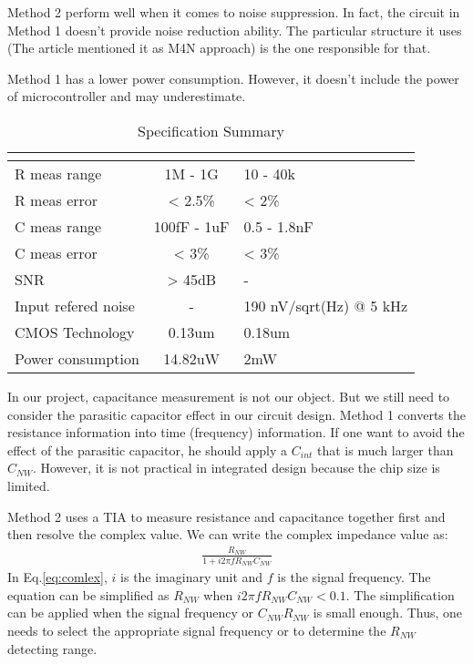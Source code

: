 Method 2 perform well when it comes to noise suppression.
In fact, the circuit in Method 1 doesn't provide noise reduction ability.
The particular structure it uses (The article \cite{Juv1} mentioned it as M4N approach) is the one responsible for that.

Method 1 has a lower power consumption. However, it doesn't include the power of microcontroller and may underestimate.

\begin{table}[!htb]
    {\fontfamily{}\fontsize{10}{14}\selectfont
    \centering
    \begin{tabular}{l|cp{4cm}}
        & \cite{Juv2} & \cite{Jlockin}\\
        \hline
        R meas range & 1M - 1G & 10 - 40k\\
        \hline
        R meas error & < 2.5\% & < 2\%\\
        \hline
        C meas range & 100fF - 1uF & 0.5 - 1.8nF\\
        \hline
        C meas error & < 3\% & < 3\%\\
        \hline
        SNR & > 45dB & - \\
        \hline
        Input refered noise & - & 190 nV/sqrt(Hz) @ 5 kHz \\
        \hline
        CMOS Technology & 0.13um & 0.18um\\
        \hline
        Power consumption & 14.82uW & 2mW\\
    \end{tabular}
    \caption{Specification Summary}
    \label{tb:LVtable}
    }
\end{table}

In our project, capacitance measurement is not our object.
But we still need to consider the parasitic capacitor effect in our circuit design.
Method 1 converts the resistance information into time (frequency) information.
If one want to avoid the effect of the parasitic capacitor, he should apply a $C_{int}$ that is much larger than $C_{NW}$.
However, it is not practical in integrated design because the chip size is limited.

Method 2 uses a TIA to measure resistance and capacitance together first and then resolve the complex value.
We can write the complex impedance value as:
\begin{align}
      \frac{R_{NW}}{1 + i2\pi f R_{NW} C_{NW}} \label{eq:comlex}
\end{align}
In Eq.\ref{eq:comlex}, $i$ is the imaginary unit and $f$ is the signal frequency.
The equation can be simplified as $R_{NW}$ when $i2\pi f R_{NW} C_{NW} < 0.1$.
The simplification can be applied when the signal frequency or $C_{NW} R_{NW}$ is small enough.
Thus, one needs to select the appropriate signal frequency or to determine the $R_{NW}$ detecting range.

